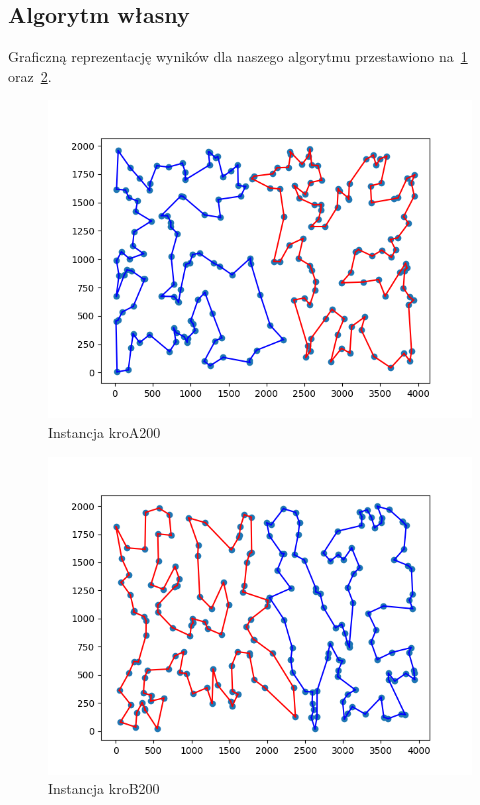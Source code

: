 \documentclass[11pt]{article}
\begin{document}
\subsection{Algorytm własny}\label{subsec:algorytm-wlasny}
Graficzną reprezentację wyników dla naszego algorytmu przestawiono na~\ref{fig:Our-kroA} oraz~\ref{fig:Our-kroB}.

\begin{figure}[H]
    \centering
    \includegraphics{best_paths/split_paths_regret_TSP_kroA200.tsp.png}
    \caption{Instancja kroA200}
    \label{fig:Our-kroA}
\end{figure}
\begin{figure}[H]
    \centering
    \includegraphics{best_paths/split_paths_regret_TSP_kroB200.tsp.png}
    \caption{Instancja kroB200}
    \label{fig:Our-kroB}
\end{figure}
\end{document}
